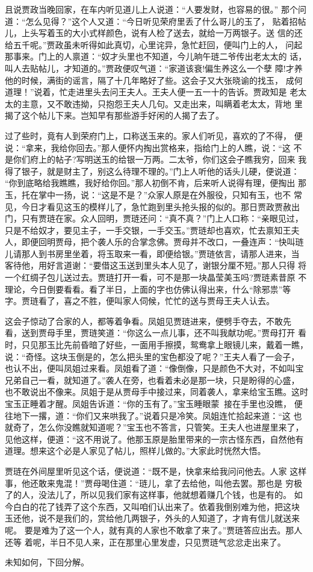 且说贾政当晚回家，在车内听见道儿上人说道：“人要发财，也容易的很。”
那个问道：“怎么见得？”这个人又道：“今日听见荣府里丢了什么哥儿的玉了，
贴着招帖儿，上头写着玉的大小式样颜色，说有人检了送去，就给一万两银子。送
信的还给五千呢。”贾政虽未听得如此真切，心里诧异，急忙赶回，便叫门上的人，
问起那事来。门上的人禀道：“奴才头里也不知道，今儿晌午琏二爷传出老太太的
话，叫人去贴帖儿，才知道的。”贾政便叹气道：“家道该衰!偏生养这么一个孽
障!才养他的时候，满街的谣言，隔了十几年略好了些。这会子又大张晓谕的找玉，
成何道理！”说着，忙走进里头去问王夫人。王夫人便一五一十的告诉。贾政知是
老太太的主意，又不敢违拗，只抱怨王夫人几句。又走出来，叫瞒着老太太，背地
里揭了这个帖儿下来。岂知早有那些游手好闲的人揭了去了。

过了些时，竟有人到荣府门上，口称送玉来的。家人们听见，喜欢的了不得，
便说：“拿来，我给你回去。”那人便怀内掏出赏格来，指给门上的人瞧，说：“这
不是你们府上的帖子?写明送玉的给银一万两。二太爷，你们这会子瞧我穷，回来
我得了银子，就是财主了，别这么待理不理的。”门上人听他的话头儿硬，便说道：
“你到底略给我瞧瞧，我好给你回。”那人初倒不肯，后来听人说得有理，便掏出
那玉，托在掌中一扬，说：“这是不是？”众家人原是在外服役，只知有玉，也不
常见，今日才看见这玉的模样儿了，急忙跑到里头抢头报的似的。那日贾政贾赦出
门，只有贾琏在家。众人回明，贾琏还问：“真不真？”门上人口称：“亲眼见过，
只是不给奴才，要见主子，一手交银，一手交玉。”贾琏却也喜欢，忙去禀知王夫
人，即便回明贾母，把个袭人乐的合掌念佛。贾母并不改口，一叠连声：“快叫琏
儿请那人到书房里坐着，将玉取来一看，即便给银。”贾琏依言，请那人进来，当
客待他，用好言道谢：“要借这玉送到里头本人见了，谢银分厘不短。”那人只得
将一个红绸子包儿送过去。贾琏打开一看，可不是那一块晶莹美玉吗?贾琏素昔原
不理论，今日倒要看看。看了半日，上面的字也仿佛认得出来，什么“除邪祟”等
字。贾琏看了，喜之不胜，便叫家人伺候，忙忙的送与贾母王夫人认去。

这会子惊动了合家的人，都等着争看。凤姐见贾琏进来，便劈手夺去，不敢先
看，送到贾母手里，贾琏笑道：“你这么一点儿事，还不叫我献功呢。”贾母打开
看时，只见那玉比先前昏暗了好些，一面用手擦摸，鸳鸯拿上眼镜儿来，戴着一瞧，
说：“奇怪。这块玉倒是的，怎么把头里的宝色都没了呢？”王夫人看了一会子，
也认不出，便叫凤姐过来看。凤姐看了道：“像倒像，只是颜色不大对，不如叫宝
兄弟自己一看，就知道了。”袭人在旁，也看着未必是那一块，只是盼得的心盛，
也不敢说出不像来。凤姐于是从贾母手中接过来，同着袭人，拿来给宝玉瞧。这时
宝玉正睡着才醒。凤姐告诉道：“你的玉有了。”宝玉睡眼蒙，接在手里也没瞧，
便往地下一撂，道：“你们又来哄我了。”说着只是冷笑。凤姐连忙拾起来道：“这
也就奇了，怎么你没瞧就知道呢？”宝玉也不答言，只管笑。王夫人也进屋里来了，
见他这样，便道：“这不用说了。他那玉原是胎里带来的一宗古怪东西，自然他有
道理。想来这个必是人家见了帖儿，照样儿做的。”大家此时恍然大悟。

贾琏在外间屋里听见这个话，便说道：“既不是，快拿来给我问问他去。人家
这样事，他还敢来鬼混！”贾母喝住道：“琏儿，拿了去给他，叫他去罢。那也是
穷极了的人，没法儿了，所以见我们家有这样事，他就想着赚几个钱，也是有的。
如今白白的花了钱弄了这个东西，又叫咱们认出来了。依着我倒别难为他，把这块
玉还他，说不是我们的，赏给他几两银子，外头的人知道了，才肯有信儿就送来呢。
要是难为了这一个人，就有真的人家也不敢拿了来了。”贾琏答应出去。那人还等
着呢，半日不见人来，正在那里心里发虚，只见贾琏气忿忿走出来了。

未知如何，下回分解。